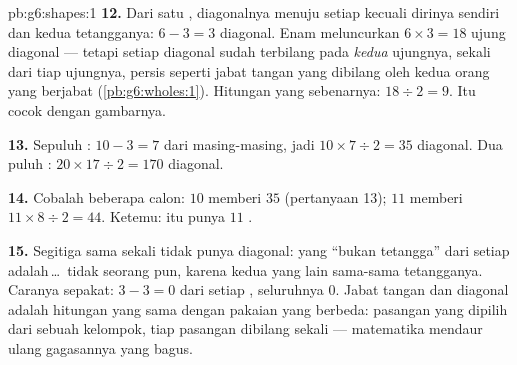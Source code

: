 \begin{solution}{pb:g6:shapes:1}
\textbf{12.} Dari satu  , diagonalnya menuju
setiap  kecuali dirinya sendiri dan kedua tetangganya:
$6 - 3 = 3$ diagonal. Enam  meluncurkan
$6 \times 3 = 18$ ujung diagonal --- tetapi setiap diagonal sudah
terbilang pada \emph{kedua} ujungnya, sekali dari tiap ujungnya,
persis seperti jabat tangan yang dibilang oleh kedua orang yang
berjabat (\cref{pb:g6:wholes:1}). Hitungan yang sebenarnya:
$18 \div 2 = 9$. Itu cocok dengan gambarnya.

\textbf{13.} Sepuluh : $10 - 3 = 7$ dari masing-masing,
jadi $10 \times 7 \div 2 = 35$ diagonal. Dua puluh :
$20 \times 17 \div 2 = 170$ diagonal.

\textbf{14.} Cobalah beberapa calon: $10$  memberi $35$
(pertanyaan 13); $11$  memberi $11 \times 8 \div 2 = 44$.
Ketemu:  itu punya $11$ .

\textbf{15.} Segitiga sama sekali tidak punya diagonal: yang ``bukan
tetangga'' dari setiap  adalah\,\dots\ tidak seorang
pun, karena kedua  yang lain sama-sama tetangganya. Caranya
sepakat: $3 - 3 = 0$ dari setiap , seluruhnya $0$. Jabat
tangan dan diagonal adalah hitungan yang sama dengan pakaian yang
berbeda: pasangan yang dipilih dari sebuah kelompok, tiap pasangan
dibilang sekali --- matematika mendaur ulang gagasannya yang bagus.

\end{solution}
